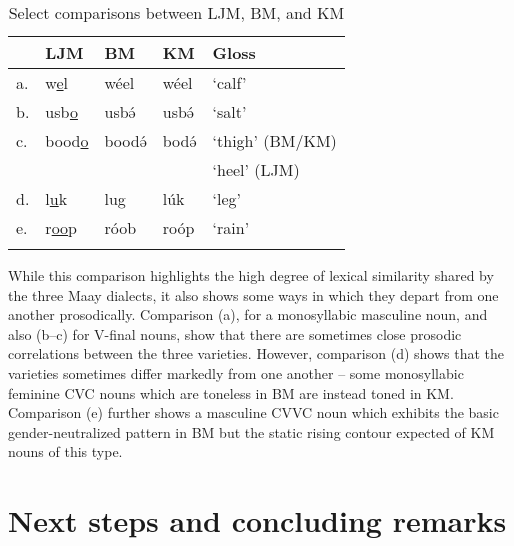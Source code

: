 \documentclass[output=paper,colorlinks,citecolor=brown]{langscibook}
\begin{document}
\begin{table}
\caption{Select comparisons between LJM, BM, and KM}
\label{tab:DialectComp}
 \begin{tabular}{lllll}
  \lsptoprule
    & LJM & BM & KM & Gloss \\
  \midrule
  a. & w\underline{e}l & wéel & wéel & `calf' \\
   b. & usb\underline{o} & usbə́ & usbə́ & `salt' \\
 c. & bood\underline{o} & boodə́ & bodə́ & `thigh' (BM/KM)\\
   &&&& `heel' (LJM) \\
 d. & l\underline{u}k & lug & lúk & `leg' \\
  e. & r\underline{oo}p & róob & roóp & `rain' \\
  \lspbottomrule
 \end{tabular}
\end{table}

While this comparison highlights the high degree of lexical similarity shared by the three Maay dialects, it also shows some ways in which they depart from one another prosodically. Comparison (a), for a monosyllabic masculine noun, and also (b--c) for V-final nouns, show that there are sometimes close prosodic correlations between the three varieties. However, comparison (d) shows that the varieties sometimes differ markedly from one another -- some monosyllabic feminine CVC nouns which are toneless in BM are instead toned in KM. Comparison (e) further shows a masculine CVVC noun which exhibits the basic gender-neutralized pattern in BM but the static rising contour expected of KM nouns of this type. 

\section{Next steps and concluding remarks}
\end{document}
